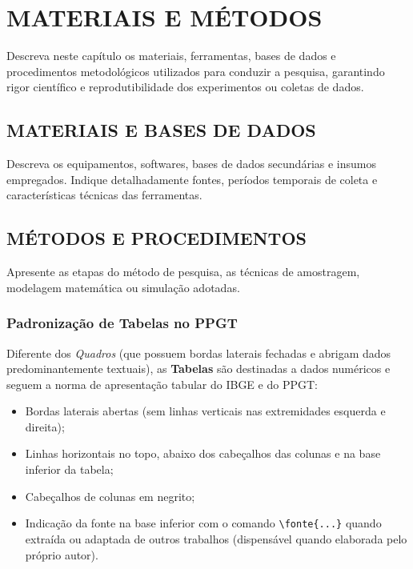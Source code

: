 \chapter{MATERIAIS E MÉTODOS}
\label{capitulo3}

Descreva neste capítulo os materiais, ferramentas, bases de dados e procedimentos metodológicos utilizados para conduzir a pesquisa, garantindo rigor científico e reprodutibilidade dos experimentos ou coletas de dados.

\section{MATERIAIS E BASES DE DADOS}
\label{sec:materiais}

Descreva os equipamentos, softwares, bases de dados secundárias e insumos empregados. Indique detalhadamente fontes, períodos temporais de coleta e características técnicas das ferramentas.

\section{MÉTODOS E PROCEDIMENTOS}
\label{sec:metodos}

Apresente as etapas do método de pesquisa, as técnicas de amostragem, modelagem matemática ou simulação adotadas.

\subsection{Padronização de Tabelas no PPGT}
\label{subsec:tabelas}

Diferente dos \textit{Quadros} (que possuem bordas laterais fechadas e abrigam dados predominantemente textuais), as \textbf{Tabelas} são destinadas a dados numéricos e seguem a norma de apresentação tabular do IBGE e do PPGT:
\begin{itemize}
  \item Bordas laterais abertas (sem linhas verticais nas extremidades esquerda e direita);
  \item Linhas horizontais no topo, abaixo dos cabeçalhos das colunas e na base inferior da tabela;
  \item Cabeçalhos de colunas em negrito;
  \item Indicação da fonte na base inferior com o comando \texttt{\textbackslash fonte\{...\}} quando extraída ou adaptada de outros trabalhos (dispensável quando elaborada pelo próprio autor).
\end{itemize}

